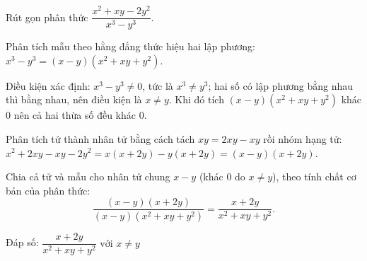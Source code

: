 \begin{problem}[8DS-PS-015]
Rút gọn phân thức $\dfrac{x^2 + xy - 2y^2}{x^3 - y^3}$.

\begin{solution}
Phân tích mẫu theo hằng đẳng thức hiệu hai lập phương: $x^3 - y^3 = (x - y)(x^2 + xy + y^2)$.

Điều kiện xác định: $x^3 - y^3 \neq 0$, tức là $x^3 \neq y^3$; hai số có lập phương bằng nhau thì bằng nhau, nên điều kiện là $x \neq y$. Khi đó tích $(x - y)(x^2 + xy + y^2)$ khác $0$ nên cả hai thừa số đều khác $0$.

Phân tích tử thành nhân tử bằng cách tách $xy = 2xy - xy$ rồi nhóm hạng tử: $x^2 + 2xy - xy - 2y^2 = x(x + 2y) - y(x + 2y) = (x - y)(x + 2y)$.

Chia cả tử và mẫu cho nhân tử chung $x - y$ (khác $0$ do $x \neq y$), theo tính chất cơ bản của phân thức:
\[ \dfrac{(x - y)(x + 2y)}{(x - y)(x^2 + xy + y^2)} = \dfrac{x + 2y}{x^2 + xy + y^2}. \]

Đáp số: $\boxed{\dfrac{x + 2y}{x^2 + xy + y^2} \text{ với } x \neq y}$
\end{solution}
\end{problem}

